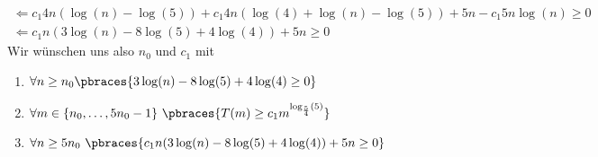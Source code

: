 \begin{solution}
\begin{align*}
	\Leftarrow c_1 4n (\log(n) - \log(5)) + c_1 4n (\log(4) + \log(n) - \log(5)) + 5n - c_1 5n \log(n) \geq 0 \\
	\Leftarrow c_1 n(3 \log(n) - 8 \log(5) + 4 \log(4)) + 5n \geq 0
	\end{align*}
	Wir wünschen uns also $n_0$ und $c_1$ mit 
		\begin{enumerate}
		\item $\forall n \geq n_0 \pbraces{3 \log(n) - 8 \log(5) + 4 \log(4) \geq 0}$
		\item $\forall m \in \{n_0, \dots, 5n_0 - 1\} \ \pbraces{T(m) \geq c_1 m^{\log_\frac{5}{4}(5)}}$
		\item $\forall n \geq 5n_0 \ \pbraces{c_1 n(3 \log(n) - 8 \log(5) + 4 \log(4)) + 5n \geq 0}$
	\end{enumerate}
\end{solution}
